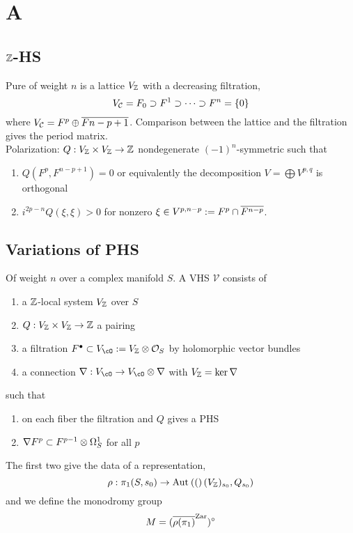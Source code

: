 \documentclass[12pt]{article}
\begin{document}
\section{A}

\newcommand{\cV}{\mathcal{V}}

\subsection{$\mathbb{Z}$-HS}

Pure of weight $n$ is a lattice $V_{\mathbb{Z}}$ with a decreasing filtration,
\[ V_{\mathcal{C}} = F_0 \supset F^1 \supset \cdots \supset F^n = \{ 0 \} \]
where $V_{\mathcal{C}} = F^p \oplus \overline{F{n-p+1}}$. Comparison between the lattice and the filtration gives the period matrix. 
\bigskip\\
Polarization: $Q : V_{\mathbb{Z}} \times V_{\mathbb{Z}} \to \mathbb{Z}$ nondegenerate $(-1)^n$-symmetric such that
\begin{enumerate}
\item $Q(F^p, F^{n-p+1}) = 0$ or equivalently the decomposition $V = \bigoplus V^{p,q}$ is orthogonal
\item $i^{2 p - n} Q(\xi, \xi) > 0$ for nonzero $\xi \in V^{p,n-p} := F^p \cap \overline{F^{n-p}}$. 
\end{enumerate}

\subsection{Variations of PHS} 

Of weight $n$ over a complex manifold $S$. A VHS $\cV$ consists of
\begin{enumerate}
\item a $\mathbb{Z}$-local system $V_{\mathbb{Z}}$ over $S$
\item $Q : V_{\mathbb{Z}} \times V_{\mathbb{Z}} \to \mathbb{Z}$ a pairing 
\item a filtration $F^\bullet \subset V_{\cO} := V_{\Z} \ot \struct{S}$ by holomorphic vector bundles
\item a connection $\nabla : V_{\cO} \to V_{\cO} \ot \nabla$ with $V_{\mathbb{Z}} = \ker{\nabla}$
\end{enumerate}
such that 
\begin{enumerate}
\item on each fiber the filtration and $Q$ gives a PHS 
\item $\nabla F^p \subset F^{p-1} \otimes \Omega^1_S$ for all $p$
\end{enumerate}
The first two give the data of a representation,
\[ \rho : \pi_1(S, s_0) \to \mathrm{Aut}_{} \left( ( \right)(V_{\mathbb{Z}})_{s_0}, Q_{s_0}) \]
and we define the monodromy group
\[ M = ( \overline{\rho(\pi_1)}^{\text{Zar}} )^\circ \]
\end{document}
